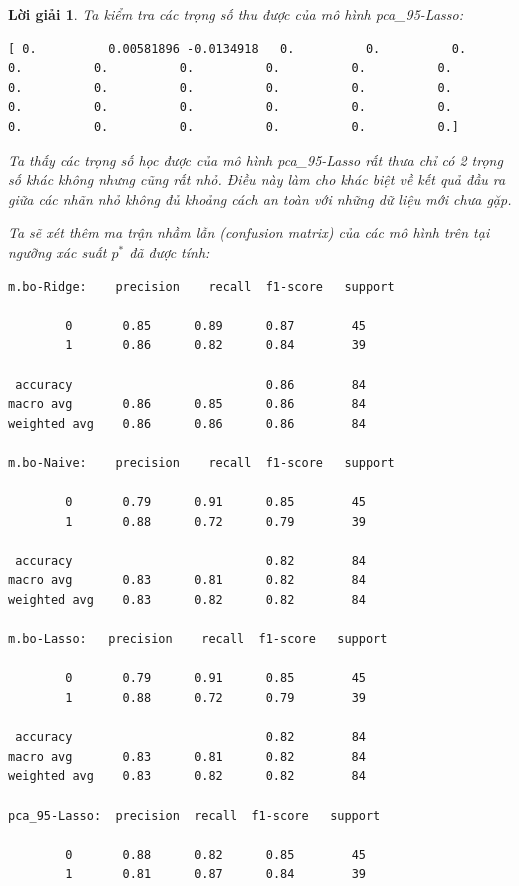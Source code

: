 \documentclass[14pt, a4paper]{article}
\theoremstyle{sltheorem}
\theoremstyle{soltheorem}
\newtheorem*{loigiai}{Lời giải}
\begin{document}
\begin{loigiai}
    Ta kiểm tra các trọng số thu được của mô hình pca\_95-Lasso:

    \begin{verbatim}
[ 0.          0.00581896 -0.0134918   0.          0.          0.
0.          0.          0.          0.          0.          0.
0.          0.          0.          0.          0.          0.
0.          0.          0.          0.          0.          0.
0.          0.          0.          0.          0.          0.]
    \end{verbatim}

    Ta thấy các trọng số học được của mô hình pca\_95-Lasso rất thưa chỉ có 2 trọng số khác không nhưng cũng rất nhỏ.
    Điều này làm cho khác biệt về kết quả đầu ra giữa các nhãn nhỏ không đủ khoảng cách an toàn với những dữ liệu mới chưa gặp.

    Ta sẽ xét thêm ma trận nhầm lẫn (confusion matrix) của các mô hình trên tại ngưỡng xác suất $p^*$ đã được tính:

    \begin{verbatim}
m.bo-Ridge:    precision    recall  f1-score   support

        0       0.85      0.89      0.87        45
        1       0.86      0.82      0.84        39

 accuracy                           0.86        84
macro avg       0.86      0.85      0.86        84
weighted avg    0.86      0.86      0.86        84

m.bo-Naive:    precision    recall  f1-score   support

        0       0.79      0.91      0.85        45
        1       0.88      0.72      0.79        39

 accuracy                           0.82        84
macro avg       0.83      0.81      0.82        84
weighted avg    0.83      0.82      0.82        84

m.bo-Lasso:   precision    recall  f1-score   support

        0       0.79      0.91      0.85        45
        1       0.88      0.72      0.79        39

 accuracy                           0.82        84
macro avg       0.83      0.81      0.82        84
weighted avg    0.83      0.82      0.82        84

pca_95-Lasso:  precision  recall  f1-score   support

        0       0.88      0.82      0.85        45
        1       0.81      0.87      0.84        39


\end{verbatim}
\end{loigiai}
\end{document}
